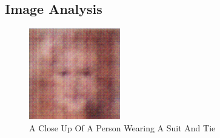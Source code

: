 \documentclass{article}%
\begin{document}
%
\subsection{Image Analysis}%
\label{subsec:ImageAnalysis}%


\begin{figure}[h!]%
\centering%
\includegraphics[width=150px]{500_fake_images/samples_5_393.png}%
\caption{A Close Up Of A Person Wearing A Suit And Tie}%
\end{figure}

%
\end{document}
